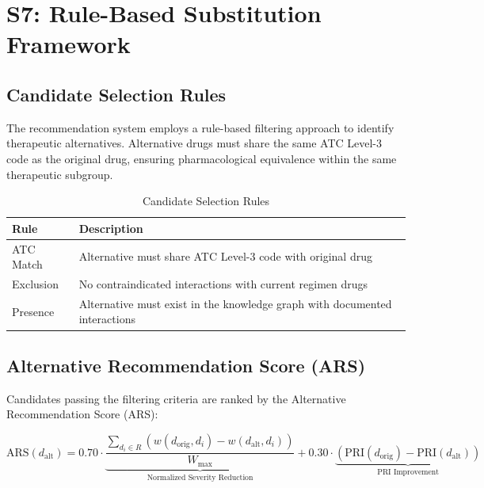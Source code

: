 \documentclass[11pt,a4paper]{article}
\begin{document}
\section{S7: Rule-Based Substitution Framework}

\subsection{Candidate Selection Rules}

The recommendation system employs a rule-based filtering approach to identify therapeutic alternatives. Alternative drugs must share the same ATC Level-3 code as the original drug, ensuring pharmacological equivalence within the same therapeutic subgroup.

\begin{table}[H]
\centering
\caption{Candidate Selection Rules}
\label{tab:candidate_rules}
\begin{tabular}{lp{10cm}}
\toprule
\textbf{Rule} & \textbf{Description} \\
\midrule
ATC Match & Alternative must share ATC Level-3 code with original drug \\
Exclusion & No contraindicated interactions with current regimen drugs \\
Presence & Alternative must exist in the knowledge graph with documented interactions \\
\bottomrule
\end{tabular}
\end{table}

\subsection{Alternative Recommendation Score (ARS)}

Candidates passing the filtering criteria are ranked by the Alternative Recommendation Score (ARS):

\begin{equation}
\text{ARS}(d_{\text{alt}}) = 0.70 \cdot \underbrace{\frac{\sum_{d_i \in R} \left( w(d_{\text{orig}}, d_i) - w(d_{\text{alt}}, d_i) \right)}{W_{\text{max}}}}_{\text{Normalized Severity Reduction}} + 0.30 \cdot \underbrace{\left( \text{PRI}(d_{\text{orig}}) - \text{PRI}(d_{\text{alt}}) \right)}_{\text{PRI Improvement}}
\end{equation}
\end{document}
